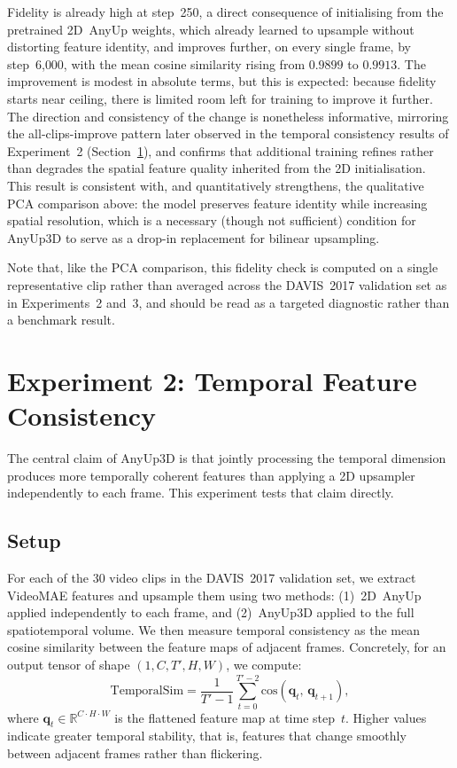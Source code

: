 Fidelity is already high at step~250, a direct consequence of initialising from the pretrained 2D~AnyUp weights, which already learned to upsample without distorting feature identity, and improves further, on every single frame, by step~6{,}000, with the mean cosine similarity rising from $0.9899$ to $0.9913$.
The improvement is modest in absolute terms, but this is expected: because fidelity starts near ceiling, there is limited room left for training to improve it further.
The direction and consistency of the change is nonetheless informative, mirroring the all-clips-improve pattern later observed in the temporal consistency results of Experiment~2 (Section~\ref{sec:temporal}), and confirms that additional training refines rather than degrades the spatial feature quality inherited from the 2D initialisation.
This result is consistent with, and quantitatively strengthens, the qualitative PCA comparison above: the model preserves feature identity while increasing spatial resolution, which is a necessary (though not sufficient) condition for AnyUp3D to serve as a drop-in replacement for bilinear upsampling.

Note that, like the PCA comparison, this fidelity check is computed on a single representative clip rather than averaged across the DAVIS~2017 validation set as in Experiments~2 and~3, and should be read as a targeted diagnostic rather than a benchmark result.


\section{Experiment 2: Temporal Feature Consistency}
\label{sec:temporal}

The central claim of AnyUp3D is that jointly processing the temporal dimension produces more temporally coherent features than applying a 2D upsampler independently to each frame.
This experiment tests that claim directly.

\subsection{Setup}

For each of the 30 video clips in the DAVIS~2017 validation set, we extract VideoMAE features and upsample them using two methods: (1)~2D~AnyUp applied independently to each frame, and (2)~AnyUp3D applied to the full spatiotemporal volume.
We then measure temporal consistency as the mean cosine similarity between the feature maps of adjacent frames.
Concretely, for an output tensor of shape $(1, C, T', H, W)$, we compute:
\begin{equation}
    \text{TemporalSim} = \frac{1}{T'-1} \sum_{t=0}^{T'-2}
    \text{cos}\!\left(\mathbf{q}_t,\, \mathbf{q}_{t+1}\right),
    \label{eq:temporal_sim}
\end{equation}
where $\mathbf{q}_t \in \mathbb{R}^{C \cdot H \cdot W}$ is the flattened feature map at time step~$t$.
Higher values indicate greater temporal stability, that is, features that change smoothly between adjacent frames rather than flickering.

